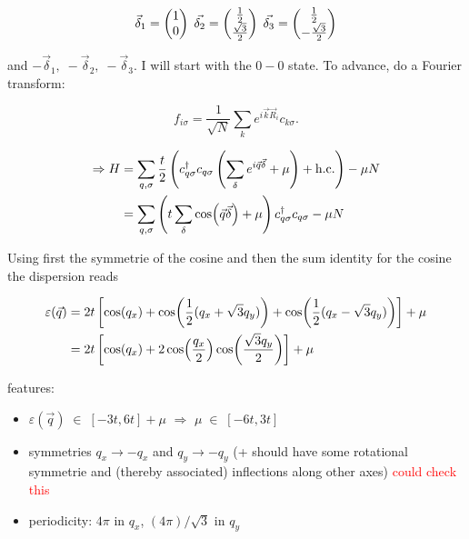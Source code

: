 \documentclass[../../../maim.tex]{subfiles}
\begin{document}
\begin{equation}
\vec{\delta}_1=
\begin{pmatrix}
1 \\ 0
\end{pmatrix} \; 
\vec{\delta_2}=
\begin{pmatrix}
\frac{1}{2} \\ \frac{\sqrt{3}}{2}
\end{pmatrix} \;
\vec{\delta_3}=
\begin{pmatrix}
\frac{1}{2} \\ -\frac{\sqrt{3}}{2}
\end{pmatrix}
\notag 
\end{equation}

and $-\vec{\delta}_1, \; -\vec{\delta}_2, \; -\vec{\delta}_3$. I will start with the $0-0$ state. To advance, do a Fourier transform:

\begin{equation}
f_{i \sigma} = \frac{1}{\sqrt{N}}\sum_k e^{i\vec{k}\vec{R}_i} c_{k \sigma}.
\end{equation}

\begin{align}
	\Rightarrow H &= \sum_{q,\sigma} \frac{t}{2} \left(c_{q\sigma}^\dagger c_{q\sigma} \left(\sum_\delta e^{i\vec{q}\vec{\delta}} + \mu \right) + \text{h.c.}\right) - \mu N \notag \\
	&= \sum_{q,\sigma}\left(t\sum_{\delta} \cos(\vec{q}\vec{\delta}) + \mu\right) c_{q\sigma}^\dagger c_{q\sigma} - \mu N
\end{align}

Using first the symmetrie of the cosine and then the sum identity for the cosine the dispersion reads

\begin{align}
	\varepsilon(\vec{q}) &= 2t\left[\cos(q_x) + \cos(\frac12(q_x + \sqrt{3}q_y)) + \cos(\frac12(q_x - \sqrt{3}q_y))\right] + \mu \notag \\
&= 2t \left[\cos(q_x) + 2 \cos(\frac{q_x}{2})\cos(\frac{\sqrt{3}q_y}{2})\right] + \mu
\end{align}

features:

\begin{itemize}
	\item $\varepsilon(\vec{q}) \; \in \; [-3t, 6t] + \mu$ $\Rightarrow$ $\mu \; \in \; [-6t, 3t]$
	\item symmetries $q_x \rightarrow -q_x$ and $q_y \rightarrow -q_y$ (+ should have some rotational symmetrie and (thereby associated) inflections along other axes) \textcolor{red}{could check this}
	\item periodicity: $4\pi$ in $q_x$, $(4\pi)/\sqrt{3}$ in $q_y$
\end{itemize}
\end{document}
